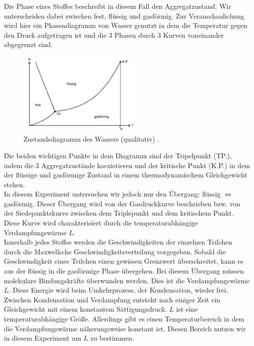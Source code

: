 Die \glqq Phase\grqq{} eines Stoffes beschreibt in diesem Fall den Aggregatzustand. Wir unterscheiden dabei zwischen fest, flüssig und gasförmig.
Zur Veranschaulichung wird hier ein Phasendiagramm von Wasser genutzt in dem die Temperatur gegen den Druck aufgetragen ist und die 3 \glqq Phasen\grqq{}
durch 3 Kurven voneinander abgegrenzt sind.\\
\begin{figure}[H]
    \centering
    \includegraphics[width=0.55\textwidth]{images/Diagramm.PNG}
    \caption{Zustandsdiagramm des Wassers (qualitativ) \protect \cite{V203}.}
    \label{img:Zustand}
\end{figure}
Die beiden wichtigen Punkte in dem Diagramm sind der Tripelpunkt (TP.), indem die 
3 Aggregatzustände koexistieren und der kritische Punkt (K.P.) in dem der flüssige und gasförmige Zustand in einem 
thermodynamischem Gleichgewicht stehen.\\
In diesem Experiment untersuchen wir jedoch nur den Übergang: flüssig $\Leftrightarrow$ gasförmig. 
Dieser Übergang wird von der Gasdruckkurve beschrieben bzw. von der Siedepunktskurve zwischen dem Triplepunkt und dem kritischem Punkt.
Diese Kurve wird charakterisiert durch die temperaturabhängige Verdampfungswärme $L$. \\
Innerhalb jedes Stoffes werden die Geschwindigkeiten der einzelnen Teilchen
durch die Maxwellsche Geschwindigkeitsverteilung vorgegeben. Sobald die Geschwindigkeit eines Teilchen einen gewissen Grenzwert 
überschreitet, kann es aus der flüssig in die gasförmige Phase übergehen. Bei diesem Übergang müssen molekulare Bindungskräfte überwunden
werden. Dies ist die Verdampfungswärme $L$. Diese Energie wird beim Umkehrprozess, der Kondensation, wieder frei.\\
Zwischen Kondensation und Verdampfung entsteht nach einiger Zeit ein Gleichgewicht mit einem konstantem Sättigungsdruck.
$L$ ist eine temperaturabhängige Größe. Allerdings gibt es einen Temperaturbereich in dem die Verdampfungswärme näherungsweise konstant ist.
Diesen Bereich nutzen wir in diesem Experiment um $L$ zu bestimmen.
